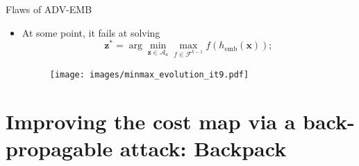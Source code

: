 \documentclass[10pt]{beamer}
\newcommand{\femb}{h_{\mathrm{emb}}}
\newcommand{\fset}{\mathcal{F}}
\begin{document}
\begin{frame}{Flaws of ADV-EMB}

    \begin{itemize}
            
        \item At some point, it fails at solving
            \begin{equation*}
                \mathbf{z}^\ast = \arg \min_{\mathbf{z} \in \mathcal{A}_a} \max_{f \in \fset^{k-1}} f(\femb(\mathbf{x}));
            \end{equation*} 
            
            \begin{figure}
                \texttt{[image: images/minmax\_evolution\_it9.pdf]}
             \end{figure}
              
    \end{itemize}

\end{frame}
    



\section{Improving the cost map via a back-propagable attack: Backpack}
\end{document}
